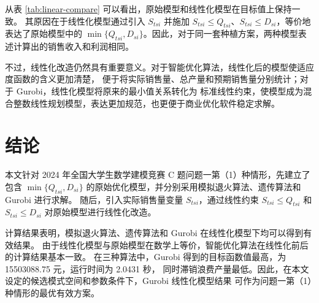 \documentclass[12pt,a4paper]{ctexart}
\begin{document}
\begin{table}[htbp]
\centering
\caption{原始模型与线性化模型计算结果比较}
\label{tab:linear-compare}
\small
\setlength{\tabcolsep}{3pt}
\end{table}

从表 \ref{tab:linear-compare} 可以看出，原始模型和线性化模型在目标值上保持一致。
其原因在于线性化模型通过引入 $S_{tsi}$ 并施加
$S_{tsi}\leq Q_{tsi}$、$S_{tsi}\leq D_{si}$，等价地表达了原始模型中的
$\min\{Q_{tsi},D_{si}\}$。因此，对于同一套种植方案，两种模型表述计算出的销售收入和利润相同。

不过，线性化改造仍然具有重要意义。对于智能优化算法，线性化后的模型使适应度函数的含义更加清楚，
便于将实际销售量、总产量和预期销售量分别统计；对于 Gurobi，线性化模型将原来的最小值关系转化为
标准线性约束，使模型成为混合整数线性规划模型，表达更加规范，也更便于商业优化软件稳定求解。

\section{结论}

本文针对 2024 年全国大学生数学建模竞赛 C 题问题一第（1）种情形，先建立了包含
$\min\{Q_{tsi},D_{si}\}$ 的原始优化模型，并分别采用模拟退火算法、遗传算法和 Gurobi 进行求解。
随后，引入实际销售量变量 $S_{tsi}$，通过线性约束
$S_{tsi}\leq Q_{tsi}$ 和 $S_{tsi}\leq D_{si}$ 对原始模型进行线性化改造。

计算结果表明，模拟退火算法、遗传算法和 Gurobi 在线性化模型下均可以得到有效结果。
由于线性化模型与原始模型在数学上等价，智能优化算法在线性化前后的计算结果基本一致。
在三种算法中，Gurobi 得到的目标函数值最高，为 15503088.75 元，运行时间为 2.0431 秒，
同时滞销浪费产量最低。因此，在本文设定的候选模式空间和参数条件下，Gurobi 线性化模型结果
可作为问题一第（1）种情形的最优有效方案。
\end{document}
